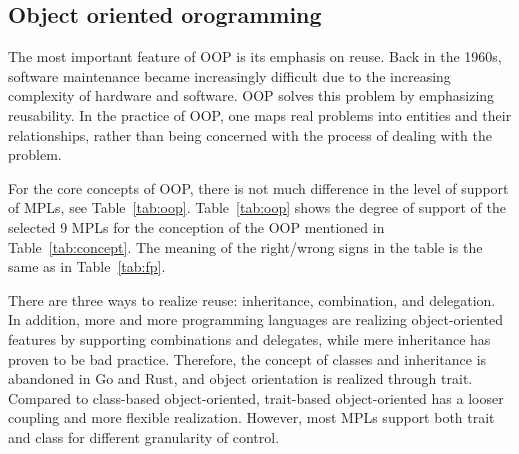 \subsection{Object oriented orogramming}
The most important feature of OOP is its emphasis on reuse. Back in the 1960s, software maintenance became increasingly difficult due to the increasing complexity of hardware and software. OOP solves this problem by emphasizing reusability. In the practice of OOP, one maps real problems into entities and their relationships, rather than being concerned with the process of dealing with the problem.


For the core concepts of OOP, there is not much difference in the level of support of MPLs, see Table~\ref{tab:oop}.
Table~\ref{tab:oop} shows the degree of support of the selected 9 MPLs for the conception of the OOP
mentioned in Table~\ref{tab:concept}.
The meaning of the right/wrong signs in the table is the same as in Table~\ref{tab:fp}.

There are three ways to realize reuse: inheritance, combination, and delegation.
In addition, more and more programming languages are realizing object-oriented
features by supporting combinations and delegates, while mere
inheritance has proven to be bad practice\cite{gamma1995design}.
Therefore, the concept of classes and inheritance is abandoned in Go and Rust, and object orientation is realized through trait. Compared to class-based object-oriented, trait-based object-oriented has a looser coupling and more flexible realization. However, most MPLs support both trait and class for different granularity of control.

